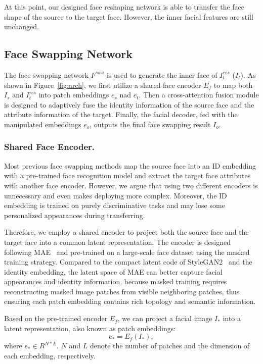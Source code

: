 At this point, our designed face reshaping network is able to transfer the face shape of the source to the target face. However, the inner facial features are still unchanged.

\subsection{Face Swapping Network}
The face swapping network $F^{swa}$ is used to generate the inner face of $I_t^{res}$ ($I_t$). As shown in Figure~\ref{fig:arch}, we first utilize a shared face encoder $E_{f}$ to map both $I_s$ and $I_t^{res}$ into patch embeddings $e_s$ nad $e_t$. Then a cross-attention fusion module is designed to adaptively fuse the identity information of the source face and the attribute information of the target. Finally, the facial decoder, fed with the manipulated embeddings $e_o$, outputs the final face swapping result $I_o$.

\subsubsection{Shared Face Encoder.}\label{para:encoder}
Most previous face swapping methods map the source face into an ID embedding with a pre-trained face recognition model and extract the target face attributes with another face encoder. 
However, we argue that using two different encoders is unnecessary and even makes deploying more complex. Moreover, the ID embedding is trained on purely discriminative tasks and may lose some personalized appearances during transferring.

Therefore, we employ a shared encoder to project both the source face and the target face into a common latent representation. 
The encoder is designed following MAE~\cite{he2022mae} and pre-trained on a large-scale face dataset using the masked training strategy. 
Compared to the compact latent code of StyleGAN2~\cite{karras2020analyzing} and the identity embedding, the latent space of MAE can better capture facial appearances and identity information, because masked training requires reconstructing masked image patches from visible neighboring patches, thus ensuring each patch embedding contains rich topology and semantic information. 

Based on the pre-trained encoder $E_f$, we can project a facial image $I_*$ into a latent representation, also known as patch embeddings:
\begin{equation}
e_* = E_f(I_*),
\end{equation}
where $e_* \in R^{N*L}$. $N$ and $L$ denote the number of patches and the dimension of each embedding, respectively. 

